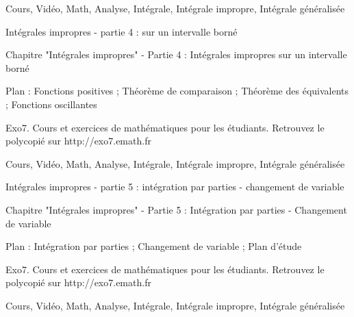 
Cours, Vidéo, Math, Analyse, Intégrale, Intégrale impropre, Intégrale généralisée



Intégrales impropres - partie 4 : sur un intervalle borné



Chapitre "Intégrales impropres" - Partie 4 : Intégrales impropres sur un intervalle borné

Plan : Fonctions positives ; Théorème de comparaison ;
Théorème des équivalents ; Fonctions oscillantes

Exo7. Cours et exercices de mathématiques pour les étudiants.
Retrouvez le polycopié sur http://exo7.emath.fr


Cours, Vidéo, Math, Analyse, Intégrale, Intégrale impropre, Intégrale généralisée



Intégrales impropres - partie 5 : intégration par parties - changement de variable



Chapitre "Intégrales impropres" - Partie 5 : Intégration par parties - Changement de variable

Plan : Intégration par parties ; Changement de variable ;
Plan d'étude

Exo7. Cours et exercices de mathématiques pour les étudiants.
Retrouvez le polycopié sur http://exo7.emath.fr


Cours, Vidéo, Math, Analyse, Intégrale, Intégrale impropre, Intégrale généralisée
